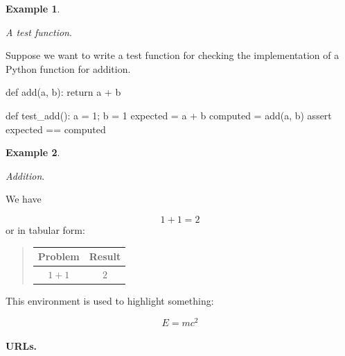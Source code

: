 \documentclass[%
oneside,                 %
final,                   %
10pt]{article}
\theoremstyle{definition}
\newtheorem{example}{Example}[section]
\begin{document}
\begin{enumerate}
\begin{example}
\label{ex:test:1p1}

\noindent\emph{A test function}.

Suppose we want to write a test function for checking the
implementation of a Python function for addition.










\bpycod
def add(a, b):
    return a + b

def test_add():
    a = 1; b = 1
    expected = a + b
    computed = add(a, b)
    assert expected == computed

\epycod

\end{example}

\begin{example}
\label{ex:math:1p1}

\noindent\emph{Addition}.

We have

\[ 1 + 1 = 2 \]
or in tabular form:


\begin{quote}
\begin{tabular}{cc}
\hline
\multicolumn{1}{c}{ Problem } & \multicolumn{1}{c}{ Result } \\
\hline
$1+1$   & $2$    \\
\hline
\end{tabular}
\end{quote}

\noindent
\end{example}

\begin{tcolorbox}[%
boxrule=1mm,
coltitle=black,
colframe=blue!45!white,
colback=blue!15!white,
width=(.9\linewidth),before=\hfill,after=\hfill,
adjusted title={Highlight box!}]
This environment is used to highlight something:

\[ E = mc^2 \]
\end{tcolorbox}

\paragraph{URLs.}
\label{subsubsec:ex}


\end{enumerate}
\end{document}
